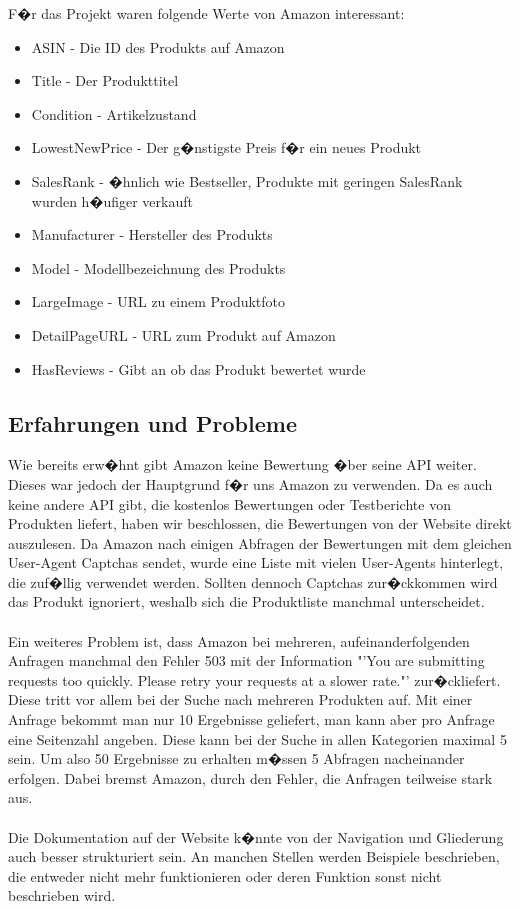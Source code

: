 F�r das Projekt waren folgende Werte von Amazon interessant:

\begin{itemize}
	\item ASIN - Die ID des Produkts auf Amazon
	\item Title - Der Produkttitel
	\item Condition - Artikelzustand
	\item LowestNewPrice - Der g�nstigste Preis f�r ein neues Produkt
	\item SalesRank - �hnlich wie Bestseller, Produkte mit geringen SalesRank wurden h�ufiger verkauft
	\item Manufacturer - Hersteller des Produkts
	\item Model - Modellbezeichnung des Produkts
	\item LargeImage - URL zu einem Produktfoto
	\item DetailPageURL - URL zum Produkt auf Amazon
	\item HasReviews - Gibt an ob das Produkt bewertet wurde
\end{itemize}

\subsection{Erfahrungen und Probleme}
Wie bereits erw�hnt gibt Amazon keine Bewertung �ber seine API weiter. Dieses war jedoch der Hauptgrund f�r uns Amazon zu verwenden. Da es auch keine andere API gibt, die kostenlos Bewertungen oder Testberichte von Produkten liefert, haben wir beschlossen, die Bewertungen von der Website direkt auszulesen. Da Amazon nach einigen Abfragen der Bewertungen mit dem gleichen User-Agent Captchas sendet, wurde eine Liste mit vielen User-Agents hinterlegt, die zuf�llig verwendet werden. Sollten dennoch Captchas zur�ckkommen wird das Produkt ignoriert, weshalb sich die Produktliste manchmal unterscheidet.
\\\\
Ein weiteres Problem ist, dass Amazon bei mehreren, aufeinanderfolgenden Anfragen manchmal den Fehler 503 mit der Information "'You are submitting requests too quickly. Please retry your requests at a slower rate."' zur�ckliefert. Diese tritt vor allem bei der Suche nach mehreren Produkten auf. Mit einer Anfrage bekommt man nur 10 Ergebnisse geliefert, man kann aber pro Anfrage eine Seitenzahl angeben. Diese kann bei der Suche in allen Kategorien maximal 5 sein. Um also 50 Ergebnisse zu erhalten m�ssen 5 Abfragen nacheinander erfolgen. Dabei bremst Amazon, durch den Fehler, die Anfragen teilweise stark aus.
\\\\
Die Dokumentation auf der Website k�nnte von der Navigation und Gliederung auch besser strukturiert sein. An manchen Stellen werden Beispiele beschrieben, die entweder nicht mehr funktionieren oder deren Funktion sonst nicht beschrieben wird.

